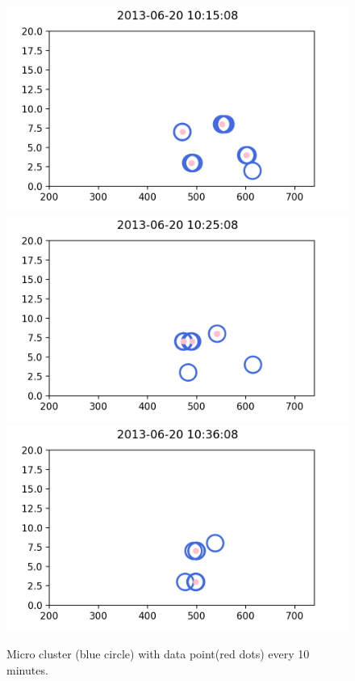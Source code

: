 \begin{figure}
        \includegraphics[width = 5 cm]{image/Chapters/Chapter6/value307.png}\hfill
        \includegraphics[width = 5 cm]{image/Chapters/Chapter6/value327.png}\hfill
        \includegraphics[width = 5 cm]{image/Chapters/Chapter6/value343.png}\hfill
    \caption{Micro cluster (blue circle) with data point(red dots) every 10 minutes.}
    \label{drift}
\end{figure}




